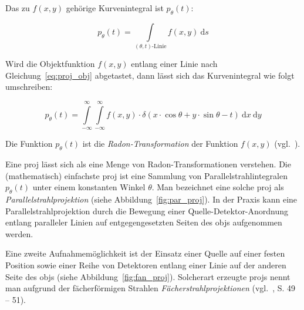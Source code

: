 Das zu $f(x, y)$ gehörige Kurvenintegral ist $p_{\theta}(t)$:

\begin{equation}\label{eq:proj_int}
    p_{\theta}(t) = \int\limits_{(\theta, t)\text{-Linie}} f(x, y)\ \mathrm{d}s
\end{equation}

Wird die Objektfunktion $f(x, y)$ entlang einer Linie nach Gleichung~\ref{eq:proj_obj} abgetastet, dann lässt sich das
Kurvenintegral wie folgt umschreiben:

\begin{equation}\label{eq:proj_radon}
    p_{\theta}(t) = \int\limits_{-\infty}^{\infty}\int\limits_{-\infty}^{\infty}f(x, y) \cdot \delta(x \cdot
                    \cos \theta + y \cdot \sin \theta - t)\ \mathrm{d} x\ \mathrm{d} y
\end{equation}

Die Funktion $p_{\theta}(t)$ ist die \textit{Radon-Transformation} der Funktion $f(x, y)$ (vgl.~\cite{radon}).

Eine \gls{proj} lässt sich als eine Menge von Radon-Transformationen verstehen. Die (mathematisch) einfachste
\gls{proj} ist eine Sammlung von Parallelstrahlintegralen $p_{\theta}(t)$ unter einem konstanten Winkel $\theta$. Man
bezeichnet eine solche \gls{proj} als \textit{Parallelstrahlprojektion} (siehe Abbildung~\ref{fig:par_proj}). In der
Praxis kann eine Parallelstrahlprojektion durch die Bewegung einer Quelle-Detektor-Anordnung entlang paralleler Linien
auf entgegengesetzten Seiten des \gls{obj}s aufgenommen werden.

Eine zweite Aufnahmemöglichkeit ist der Einsatz einer Quelle auf einer festen Position sowie einer Reihe von Detektoren
entlang einer Linie auf der anderen Seite des \gls{obj}s (siehe Abbildung~\ref{fig:fan_proj}). Solcherart erzeugte
\glspl{proj} nennt man aufgrund der fächerförmigen Strahlen \textit{Fächerstrahlprojektionen} (vgl.~\cite{kakslan},
S. 49 -- 51).

